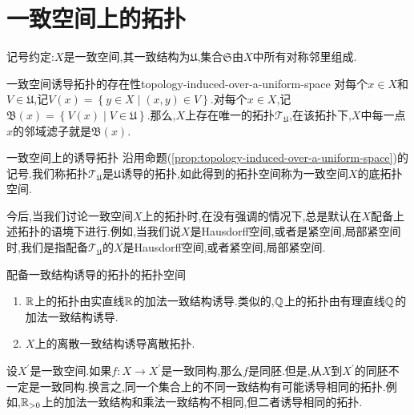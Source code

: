 \section{一致空间上的拓扑}

记号约定:$X$是一致空间,其一致结构为$\mathfrak{U}$,集合$\mathfrak{S}$由$X$中所有对称邻里组成.

\begin{proposition}{一致空间诱导拓扑的存在性}{topology-induced-over-a-uniform-space}
	对每个$x\in X$和$V\in\mathfrak{U}$,记$V\left(x\right)=\left\{y\in X\middle|\left(x,y\right)\in V\right\}$.对每个$x\in X$,记$\mathfrak{B}\left(x\right)=\left\{V\left(x\right)\middle|V\in\mathfrak{U}\right\}$.那么,$X$上存在唯一的拓扑$\mathcal{T}_{\mathfrak{U}}$,在该拓扑下,$X$中每一点$x$的邻域滤子就是$\mathfrak{B}\left(x\right)$.
\end{proposition}

\begin{definition}{一致空间上的诱导拓扑}{}
	沿用命题(\ref{prop:topology-induced-over-a-uniform-space})的记号.我们称拓扑$\mathcal{T}_{\mathfrak{U}}$是$\mathfrak{U}$诱导的拓扑,如此得到的拓扑空间称为一致空间$X$的底拓扑空间.
\end{definition}

\begin{convention}{}{}
	今后,当我们讨论一致空间$X$上的拓扑时,在没有强调的情况下,总是默认在$X$配备上述拓扑的语境下进行.例如,当我们说$X$是Hausdorff空间,或者是紧空间,局部紧空间时,我们是指配备$\mathcal{T}_{\mathfrak{U}}$的$X$是Hausdorff空间,或者紧空间,局部紧空间.
\end{convention}

\begin{example}{配备一致结构诱导的拓扑的拓扑空间}{}
	\begin{enumerate}
		\item $\mathbb{R}$上的拓扑由实直线$\mathbb{R}$的加法一致结构诱导.类似的,$\mathbb{Q}$上的拓扑由有理直线$\mathbb{Q}$的加法一致结构诱导.
		\item $X$上的离散一致结构诱导离散拓扑.
	\end{enumerate}
\end{example}

\begin{remark}{}{}
	设$X^{\prime}$是一致空间.如果$f:X\to X^{\prime}$是一致同构,那么$f$是同胚.但是,从$X$到$X^{\prime}$的同胚不一定是一致同构.换言之,同一个集合上的不同一致结构有可能诱导相同的拓扑.例如,$\mathbb{R}_{>0}$上的加法一致结构和乘法一致结构不相同,但二者诱导相同的拓扑.
\end{remark}

